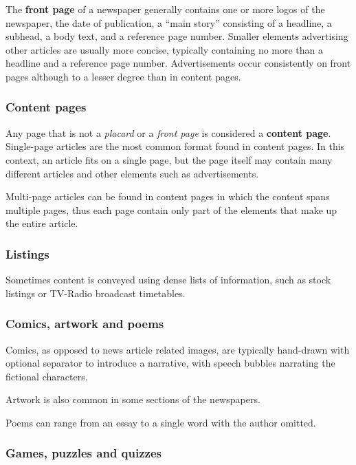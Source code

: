 \documentclass[oneside, english, bibtex]{kththesis}
\begin{document}
The \textbf{front page} of a newspaper generally contains one or more logos of the newspaper,
the date of publication, a “main story” consisting of a headline, a subhead, a body text, and a reference page number.
Smaller elements advertising other articles are usually more concise, typically containing no more than a headline and a reference page number.
Advertisements occur consistently on front pages although to a lesser degree than in content pages.

\subsubsection{Content pages}

Any page that is not a \textit{placard} or a \textit{front page} is considered a \textbf{content page}. Single-page articles are the most common format found in content pages.
In this context, an article fits on a single page, but the page itself may contain many different articles and other elements such as advertisements.

Multi-page articles can be found in content pages in which the content spans multiple pages, thus each page contain only part of the elements that make up the entire article.

\subsubsection{Listings}
\label{bgsubsec:listings}
Sometimes content is conveyed using dense lists of information, such as stock listings or TV-Radio broadcast timetables.

\subsubsection{Comics, artwork and poems}

Comics, as opposed to news article related images, are typically hand-drawn with optional separator to introduce a narrative, with speech bubbles narrating the fictional characters.

Artwork is also common in some sections of the newspapers.

Poems can range from an essay to a single word with the author omitted.

\subsubsection{Games, puzzles and quizzes}
\end{document}
